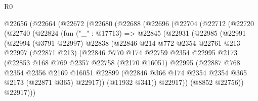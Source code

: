 \begin{lexlean}{R0}
\begin{coremodule}
    @22656
      (@22664
        (@22672
          (@22680
            (@22688
              (@22696
                (@22704
                  (@22712
                    (@22720
                      (@22740
                        (@22824
                          (fun ("_" : @17713) =>
                          @22845
                            (@22931
                              (@22985
                                (@22991
                                  (@22994
                                    (@3791 @22997)
                                    @22838
                                    (@22846
                                      @214
                                      @772
                                      @2354
                                      @22761
                                      @213
                                      @22997
                                      (@22871 @213)
                                      (@22846
                                        @770
                                        @174
                                        @22759
                                        @2354
                                        @22995
                                        @2173
                                        (@22853
                                          @168
                                          @769
                                          @2357
                                          @22758
                                          (@2170 @16051)
                                          @22995
                                          (@22887
                                            @768
                                            @2354
                                            @2356
                                            @2169
                                            @16051
                                            @22899
                                            (@22846
                                              @366
                                              @174
                                              @2354
                                              @2354
                                              @365
                                              @2173
                                              (@22871 @365)
                                              @22917))
                                          (@11932 @341))
                                        @22917))
                                    (@8852 @22756))
                                  @22917)))

\end{coremodule}
\end{lexlean}
